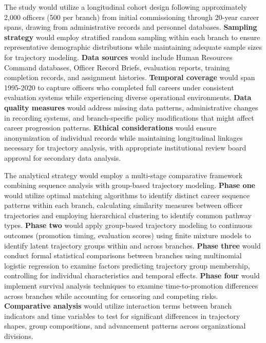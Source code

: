 \documentclass[main.tex]{subfiles}
\begin{document}

The study would utilize a longitudinal cohort design following approximately 2,000 officers (500 per branch) from initial commissioning through 20-year career spans, drawing from administrative records and personnel databases. \textbf{Sampling strategy} would employ stratified random sampling within each branch to ensure representative demographic distributions while maintaining adequate sample sizes for trajectory modeling. \textbf{Data sources} would include Human Resources Command databases, Officer Record Briefs, evaluation reports, training completion records, and assignment histories. \textbf{Temporal coverage} would span 1995-2020 to capture officers who completed full careers under consistent evaluation systems while experiencing diverse operational environments. \textbf{Data quality measures} would address missing data patterns, administrative changes in recording systems, and branch-specific policy modifications that might affect career progression patterns. \textbf{Ethical considerations} would ensure anonymization of individual records while maintaining longitudinal linkages necessary for trajectory analysis, with appropriate institutional review board approval for secondary data analysis.


The analytical strategy would employ a multi-stage comparative framework combining sequence analysis with group-based trajectory modeling. \textbf{Phase one} would utilize optimal matching algorithms to identify distinct career sequence patterns within each branch, calculating similarity measures between officer trajectories and employing hierarchical clustering to identify common pathway types. \textbf{Phase two} would apply group-based trajectory modeling to continuous outcomes (promotion timing, evaluation scores) using finite mixture models to identify latent trajectory groups within and across branches. \textbf{Phase three} would conduct formal statistical comparisons between branches using multinomial logistic regression to examine factors predicting trajectory group membership, controlling for individual characteristics and temporal effects. \textbf{Phase four} would implement survival analysis techniques to examine time-to-promotion differences across branches while accounting for censoring and competing risks. \textbf{Comparative analysis} would utilize interaction terms between branch indicators and time variables to test for significant differences in trajectory shapes, group compositions, and advancement patterns across organizational divisions.
\end{document}

